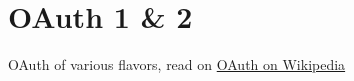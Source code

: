\section{OAuth 1 \& 2}

OAuth of various flavors, read on
\href{https://en.wikipedia.org/wiki/OAuth}{%
OAuth on Wikipedia}

